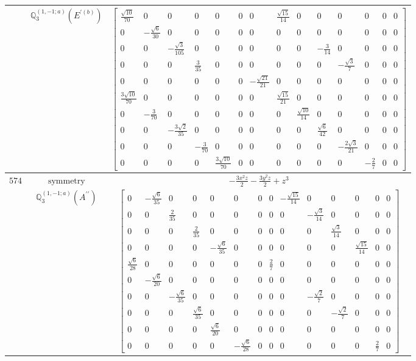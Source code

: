 \documentclass[fleqn,8pt,landscape]{jsarticle}
\begin{document}
\begin{longtable}{ccc}
$  $ & $ \mathbb{Q}_{3}^{(1,-1;a)}(E^{\prime(b)}) $ & $ \begin{bmatrix} \frac{\sqrt{10}}{70} & 0 & 0 & 0 & 0 & 0 & 0 & \frac{\sqrt{15}}{14} & 0 & 0 & 0 & 0 & 0 & 0 \\ 0 & - \frac{\sqrt{6}}{30} & 0 & 0 & 0 & 0 & 0 & 0 & 0 & 0 & 0 & 0 & 0 & 0 \\ 0 & 0 & - \frac{\sqrt{3}}{105} & 0 & 0 & 0 & 0 & 0 & 0 & - \frac{3}{14} & 0 & 0 & 0 & 0 \\ 0 & 0 & 0 & \frac{3}{35} & 0 & 0 & 0 & 0 & 0 & 0 & - \frac{\sqrt{3}}{7} & 0 & 0 & 0 \\ 0 & 0 & 0 & 0 & 0 & 0 & - \frac{\sqrt{21}}{21} & 0 & 0 & 0 & 0 & 0 & 0 & 0 \\ \frac{3 \sqrt{10}}{70} & 0 & 0 & 0 & 0 & 0 & 0 & \frac{\sqrt{15}}{21} & 0 & 0 & 0 & 0 & 0 & 0 \\ 0 & - \frac{3}{70} & 0 & 0 & 0 & 0 & 0 & 0 & \frac{\sqrt{10}}{14} & 0 & 0 & 0 & 0 & 0 \\ 0 & 0 & - \frac{3 \sqrt{2}}{35} & 0 & 0 & 0 & 0 & 0 & 0 & \frac{\sqrt{6}}{42} & 0 & 0 & 0 & 0 \\ 0 & 0 & 0 & - \frac{3}{70} & 0 & 0 & 0 & 0 & 0 & 0 & - \frac{2 \sqrt{3}}{21} & 0 & 0 & 0 \\ 0 & 0 & 0 & 0 & \frac{3 \sqrt{10}}{70} & 0 & 0 & 0 & 0 & 0 & 0 & - \frac{2}{7} & 0 & 0 \end{bmatrix} $ \\ \hline
$ 574 $ & $ \text{symmetry} $ & $ - \frac{3 x^{2} z}{2} - \frac{3 y^{2} z}{2} + z^{3} $ \\
$  $ & $ \mathbb{Q}_{3}^{(1,-1;a)}(A^{\prime\prime}) $ & $ \begin{bmatrix} 0 & - \frac{\sqrt{6}}{35} & 0 & 0 & 0 & 0 & 0 & 0 & - \frac{\sqrt{15}}{14} & 0 & 0 & 0 & 0 & 0 \\ 0 & 0 & \frac{2}{35} & 0 & 0 & 0 & 0 & 0 & 0 & - \frac{\sqrt{3}}{14} & 0 & 0 & 0 & 0 \\ 0 & 0 & 0 & \frac{2}{35} & 0 & 0 & 0 & 0 & 0 & 0 & \frac{\sqrt{3}}{14} & 0 & 0 & 0 \\ 0 & 0 & 0 & 0 & - \frac{\sqrt{6}}{35} & 0 & 0 & 0 & 0 & 0 & 0 & \frac{\sqrt{15}}{14} & 0 & 0 \\ \frac{\sqrt{6}}{28} & 0 & 0 & 0 & 0 & 0 & 0 & \frac{2}{7} & 0 & 0 & 0 & 0 & 0 & 0 \\ 0 & - \frac{\sqrt{6}}{20} & 0 & 0 & 0 & 0 & 0 & 0 & 0 & 0 & 0 & 0 & 0 & 0 \\ 0 & 0 & - \frac{\sqrt{6}}{35} & 0 & 0 & 0 & 0 & 0 & 0 & - \frac{\sqrt{2}}{7} & 0 & 0 & 0 & 0 \\ 0 & 0 & 0 & \frac{\sqrt{6}}{35} & 0 & 0 & 0 & 0 & 0 & 0 & - \frac{\sqrt{2}}{7} & 0 & 0 & 0 \\ 0 & 0 & 0 & 0 & \frac{\sqrt{6}}{20} & 0 & 0 & 0 & 0 & 0 & 0 & 0 & 0 & 0 \\ 0 & 0 & 0 & 0 & 0 & - \frac{\sqrt{6}}{28} & 0 & 0 & 0 & 0 & 0 & 0 & \frac{2}{7} & 0 \end{bmatrix} $ \\ \hline

\end{longtable}
\end{document}

